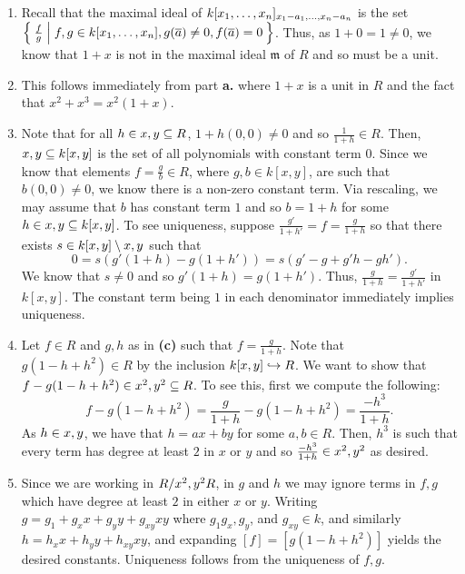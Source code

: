 \documentclass[letterpaper, 11pt, oneside]{book}
\begin{document}
\begin{sol}\label{ex:UAG_4.2.1}
  \begin{enumerate}
    \item Recall that the maximal ideal of $k[x_{1}, \ldots, x_{n}]_{\ideal{x_{1} - a_{1}, \ldots, x_{n} - a_{n}}}$ is the set $\Set{\frac{f}{g} | f, g \in k[x_{1}, \ldots, x_{n}], g(\overline{a}) \neq 0, f(\overline{a}) = 0}$.
          Thus, as $1 + 0 = 1 \neq 0$, we know that $1 + x$ is not in the maximal ideal $\mathfrak{m}$ of $R$ and so must be a unit.
    \item This follows immediately from part \textbf{a.} where $1 + x$ is a unit in $R$ and the fact that $x^{2} + x^{3} = x^{2}(1 + x)$.
    \item Note that for all $h \in \ideal{x, y} \subseteq R$, $1 + h(0, 0) \neq 0$ and so $\frac{1}{1 + h} \in R$.
          Then, $\ideal{x, y} \subseteq k[x, y]$ is the set of all polynomials with constant term $0$.
          Since we know that elements $f = \frac{g}{b} \in R$, where $g, b \in k[x, y]$, are such that $b(0, 0) \neq 0$, we know there is a non-zero constant term.
          Via rescaling, we may assume that $b$ has constant term $1$ and so $b = 1 + h$ for some $h \in \ideal{x, y} \subseteq k[x, y]$.
          To see uniqueness, suppose $\frac{g'}{1 + h'} = f = \frac{g}{1 + h}$ so that there exists $s \in k[x, y] \setminus \ideal{x, y}$ such that
          \[
            0 = s(g'(1 + h) - g(1 + h')) = s(g' - g + g'h - gh').
          \]
          We know that $s \neq 0$ and so  $g'(1 + h) = g(1 + h')$.
          Thus, $\frac{g}{1 + h} = \frac{g'}{1 + h'}$ in $k[x, y]$.
          The constant term being $1$ in each denominator immediately implies uniqueness.
    \item Let $f \in R$ and $g, h$ as in \textbf{(c)} such that $f = \frac{g}{1 + h}$.
          Note that $g(1 - h + h^{2}) \in R$ by the inclusion $k[x, y] \into R$.
          We want to show that $f - g(1 - h + h^{2}) \in \ideal{x^{2}, y^{2}} \subseteq R$.
          To see this, first we compute the following:
          \[
            f - g(1 - h + h^{2}) = \frac{g}{1 + h} - g(1 - h + h^{2}) = \frac{-h^{3}}{1 + h}.
          \]
          As $h \in \ideal{x, y}$, we have that $h = ax + by$ for some $a, b \in R$.
          Then, $h^{3}$ is such that every term has degree at least $2$ in $x$ or $y$ and so $\frac{-h^{3}}{1 + h} \in \ideal{x^{2}, y^{2}}$ as desired.
    \item Since we are working in $R / \ideal{x^{2}, y^{2}R}$, in $g$ and $h$ we may ignore terms in $f, g$ which have degree at least $2$ in either $x$ or $y$.
          Writing $g = g_{1} + g_{x}x + g_{y}y + g_{xy}xy$ where $g_{1} g_{x}, g_{y}$, and $g_{xy} \in k$, and similarly $h = h_{x}x + h_{y}y + h_{xy}xy$, and expanding $[f] = [g(1 - h + h^{2})]$ yields the desired constants.
          Uniqueness follows from the uniqueness of $f, g$.
  \end{enumerate}
\end{sol}
\end{document}
